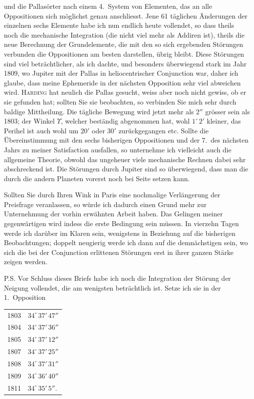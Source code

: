 \documentclass[12pt,a4paper]{article}
\begin{document}
\newpage
\setcounter{page}{426}
%
und die Pallasörter nach einem 4.~System von Elementen, das an alle Oppositionen sich möglichst genau anschliesst. Jene 61 täglichen Änderungen der einzelnen sechs Elemente habe ich nun endlich heute vollendet, so dass theils noch die mechanische Integration (die nicht viel mehr als Addiren ist), theils die neue Berechnung der Grundelemente, die mit den so sich ergebenden Störungen verbunden die Oppositionen am besten darstellen, übrig bleibt. Diese Störungen sind viel beträchtlicher, als ich dachte, und besonders überwiegend stark im Jahr 1809, wo Jupiter mit der Pallas in heliocentrischer Conjunction war, daher ich glaube, dass meine Ephemeride in der nächsten Opposition sehr viel abweichen wird. \textsc{Harding} hat neulich die Pallas gesucht, weiss aber noch nicht gewiss, ob er sie gefunden hat; sollten Sie sie beobachten, so verbinden Sie mich sehr durch baldige Mittheilung. Die tägliche Bewegung wird jetzt mehr als $2''$ grösser sein als 1803; der Winkel $\Upsilon$, welcher beständig abgenommen hat, wohl $1^\circ\,2'$ kleiner, das Perihel ist auch wohl um $20'$ oder $30'$ zurückgegangen etc. Sollte die Übereinstimmung mit den sechs bisherigen Oppositionen und der 7.~des nächsten Jahrs zu meiner Satisfaction ausfallen, so unternehme ich vielleicht auch die allgemeine Theorie, obwohl das ungeheuer viele mechanische Rechnen dabei sehr abschreckend ist. Die Störungen durch Jupiter sind so überwiegend, dass man die durch die andern Planeten vorerst noch bei Seite setzen kann.

Sollten Sie durch Ihren Wink in Paris eine nochmalige Verlängerung der Preisfrage veranlassen, so würde ich dadurch einen Grund mehr zur Unternehmung der vorhin erwähnten Arbeit haben. Das Gelingen meiner gegenwärtigen wird indess die erste Bedingung sein müssen. In vierzehn Tagen werde ich darüber im Klaren sein, wenigstens in Beziehung auf die bisherigen Beobachtungen; doppelt neugierig werde ich dann auf die demnächstigen sein, wo sich die bei der Conjunction erlittenen Störungen erst in ihrer ganzen Stärke zeigen werden.

\textsc{P.S.} Vor Schluss dieses Briefs habe ich noch die Integration der Störung der Neigung vollendet, die am wenigsten beträchtlich ist. Setze ich sie in der 1.~Opposition
\begin{center}
\begin{tabular}{l@{\quad}l}
1803 & $34^\circ\,37'\,47''$\\
1804 & $34^\circ\,37'\,36''$\\
1805 & $34^\circ\,37'\,12''$\\
1807 & $34^\circ\,37'\,25''$\\
1808 & $34^\circ\,37'\,31''$\\
1809 & $34^\circ\,36'\,40''$\\
1811 & $34^\circ\,35'\,5''$.
\end{tabular}
\end{center}
\end{document}
